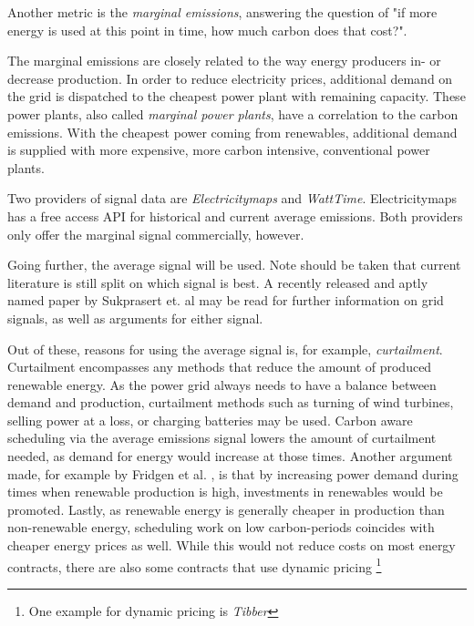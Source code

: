 Another metric is the \emph{marginal emissions}, answering the question of "if more energy is used at this point in time, how much carbon does that cost?".

The marginal emissions are closely related to the way energy producers in- or decrease production.
In order to reduce electricity prices, additional demand on the grid is dispatched to the cheapest power plant with remaining capacity. 
These power plants, also called \emph{marginal power plants}, have a correlation to the carbon emissions.
With the cheapest power coming from renewables, additional demand is supplied with more expensive, more carbon intensive, conventional power plants.

Two providers of signal data are \emph{Electricitymaps} and \emph{WattTime}.
Electricitymaps has a free access API for historical and current average emissions. Both providers only offer the marginal signal commercially, however. 

Going further, the average signal will be used. 
Note should be taken that current literature is still split on which signal is best. 
A recently released and aptly named paper by Sukprasert et. al \cite{sukprasert_limitations_2024} may be read for further information on grid signals, as well as arguments for either signal.

Out of these, reasons for using the average signal is, for example, \emph{curtailment}. 
Curtailment encompasses any methods that reduce the amount of produced renewable energy. As the power grid always needs to have a balance between demand and production, curtailment methods such as turning of wind turbines, selling power at a loss, or charging batteries may be used. 
Carbon aware scheduling via the average emissions signal lowers the amount of curtailment needed, as demand for energy would increase at those times.
Another argument made, for example by Fridgen et al. \cite{fridgen_not_2021}, is that by increasing power demand during times when renewable production is high, investments in renewables would be promoted. 
Lastly, as renewable energy is generally cheaper in production than non-renewable energy, scheduling work on low carbon-periods coincides with cheaper energy prices as well. While this would not reduce costs on most energy contracts, there are also some contracts that use dynamic pricing \footnote{One example for dynamic pricing is \emph{Tibber}}


